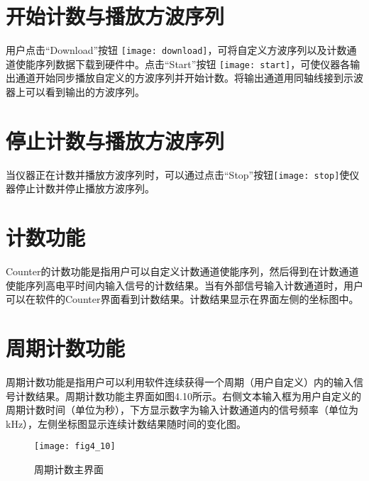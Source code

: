 \section{\heiti 开始计数与播放方波序列}
用户点击“Download”按钮
\texttt{[image: download]}，可将自定义方波序列以及计数通道使能序列数据下载到硬件中。点击“Start”按钮
\texttt{[image: start]}，可使仪器各输出通道开始同步播放自定义的方波序列并开始计数。将输出通道用同轴线接到示波器上可以看到输出的方波序列。

\section{\heiti 停止计数与播放方波序列}
当仪器正在计数并播放方波序列时，可以通过点击“Stop”按钮\texttt{[image: stop]}使仪器停止计数并停止播放方波序列。

\section{\heiti 计数功能}
Counter的计数功能是指用户可以自定义计数通道使能序列，然后得到在计数通道使能序列高电平时间内输入信号的计数结果。当有外部信号输入计数通道时，用户可以在软件的Counter界面看到计数结果。计数结果显示在界面左侧的坐标图中。

\section{\heiti 周期计数功能}
周期计数功能是指用户可以利用软件连续获得一个周期（用户自定义）内的输入信号计数结果。周期计数功能主界面如图4.10所示。右侧文本输入框为用户自定义的周期计数时间（单位为秒），下方显示数字为输入计数通道内的信号频率（单位为kHz），左侧坐标图显示连续计数结果随时间的变化图。
\begin{figure}[ht]
\centering
\texttt{[image: fig4\_10]}
\caption{周期计数主界面}
\end{figure}

